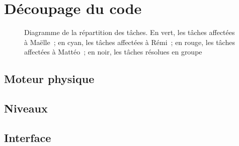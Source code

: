 \section{Découpage du code}

\begin{figure}[p!]
    \scalebox{0.56}{}
    \caption{
        Diagramme de la répartition des tâches. En vert, les tâches
        affectées à Maëlle~; en cyan, les tâches affectées à Rémi~;
        en rouge, les tâches affectées à Mattéo~; en noir, les
        tâches résolues en groupe
    }
    \label{fig:analyse-uml}
\end{figure}

\subsection{Moteur physique}
\subsection{Niveaux}
\subsection{Interface}
